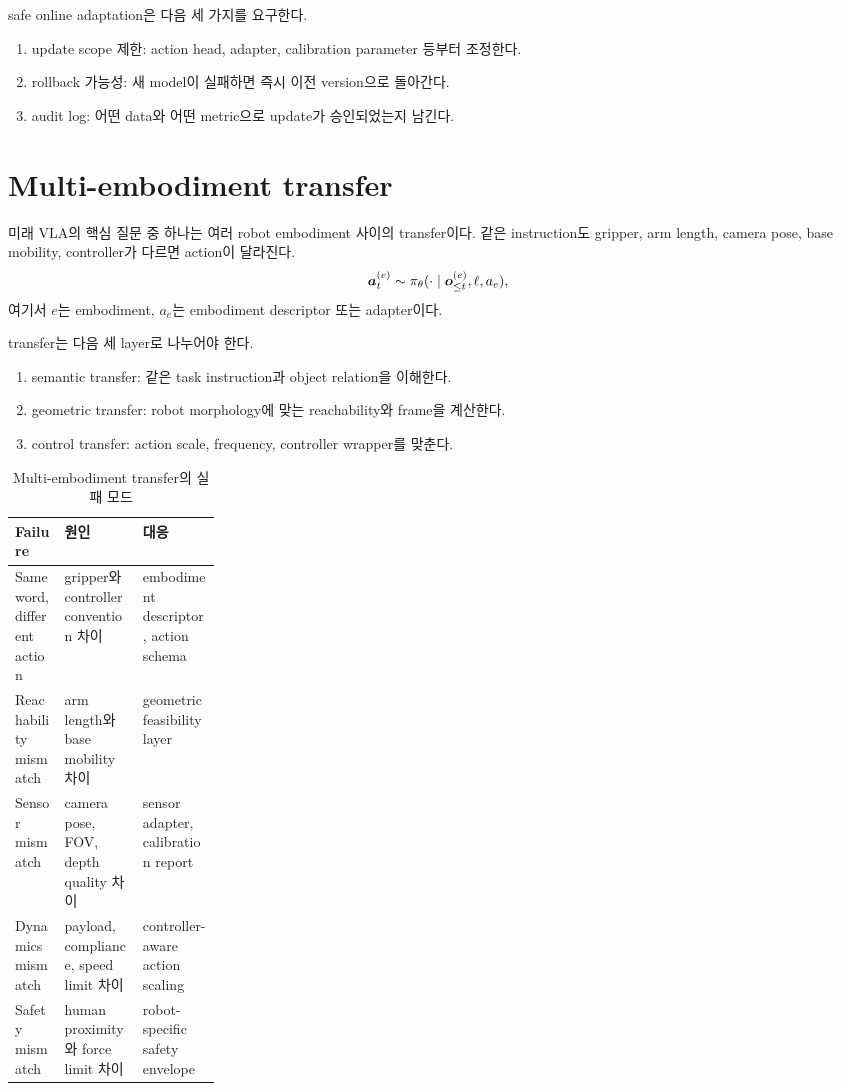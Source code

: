 safe online adaptation은 다음 세 가지를 요구한다.
\begin{enumerate}
  \item update scope 제한: action head, adapter, calibration parameter 등부터 조정한다.
  \item rollback 가능성: 새 model이 실패하면 즉시 이전 version으로 돌아간다.
  \item audit log: 어떤 data와 어떤 metric으로 update가 승인되었는지 남긴다.
\end{enumerate}

\section{Multi-embodiment transfer}

미래 VLA의 핵심 질문 중 하나는 여러 robot embodiment 사이의 transfer이다. 같은 instruction도 gripper, arm length, camera pose, base mobility, controller가 다르면 action이 달라진다.
\begin{equation}
  \bm{a}_t^{(e)}
  \sim
  \pi_{\theta}
  (
  \cdot
  \mid
  \bm{o}_{\leq t}^{(e)},
  \ell,
  a_e
  ),
  \label{eq:ch22-embodiment-conditioned}
\end{equation}
여기서 $e$는 embodiment, $a_e$는 embodiment descriptor 또는 adapter이다.

transfer는 다음 세 layer로 나누어야 한다.
\begin{enumerate}
  \item semantic transfer: 같은 task instruction과 object relation을 이해한다.
  \item geometric transfer: robot morphology에 맞는 reachability와 frame을 계산한다.
  \item control transfer: action scale, frequency, controller wrapper를 맞춘다.
\end{enumerate}

\begin{table}[h]
  \centering
  \caption{Multi-embodiment transfer의 실패 모드}
  \begin{tabularx}{\linewidth}{p{0.24\linewidth}X X}
    \toprule
    Failure & 원인 & 대응 \\
    \midrule
    Same word, different action & gripper와 controller convention 차이 & embodiment descriptor, action schema \\
    Reachability mismatch & arm length와 base mobility 차이 & geometric feasibility layer \\
    Sensor mismatch & camera pose, FOV, depth quality 차이 & sensor adapter, calibration report \\
    Dynamics mismatch & payload, compliance, speed limit 차이 & controller-aware action scaling \\
    Safety mismatch & human proximity와 force limit 차이 & robot-specific safety envelope \\
    \bottomrule
  \end{tabularx}
  \label{tab:ch22-transfer-failure}
\end{table}

